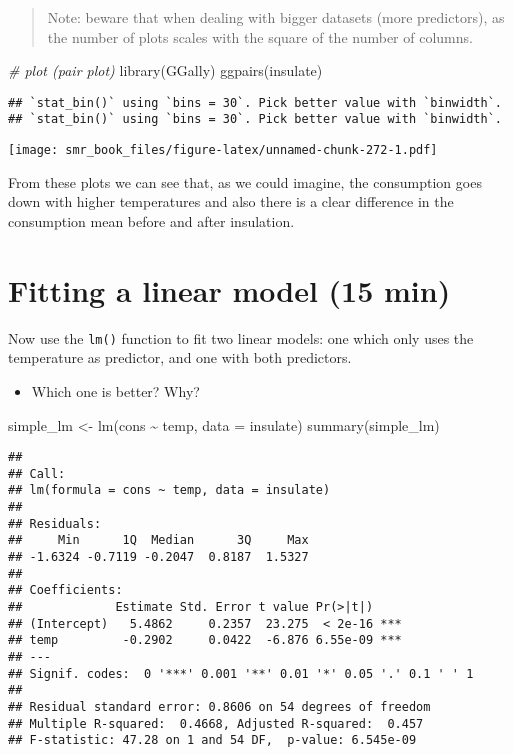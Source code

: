 \documentclass[
  oneside]{book}
\newenvironment{Shaded}{\begin{snugshade}}{\end{snugshade}}
\newcommand{\AttributeTok}[1]{\textcolor[rgb]{0.77,0.63,0.00}{#1}}
\newcommand{\CommentTok}[1]{\textcolor[rgb]{0.56,0.35,0.01}{\textit{#1}}}
\newcommand{\FunctionTok}[1]{\textcolor[rgb]{0.00,0.00,0.00}{#1}}
\newcommand{\NormalTok}[1]{#1}
\newcommand{\OtherTok}[1]{\textcolor[rgb]{0.56,0.35,0.01}{#1}}
\newcommand{\SpecialCharTok}[1]{\textcolor[rgb]{0.00,0.00,0.00}{#1}}
\providecommand{\tightlist}{%
  \setlength{\itemsep}{0pt}\setlength{\parskip}{0pt}}
\begin{document}
\begin{quote}
Note: beware that when dealing with bigger datasets (more
predictors), as the number of plots scales with the square
of the number of columns.
\end{quote}

\begin{Shaded}
\begin{Highlighting}[]
\CommentTok{\# plot (pair plot)}
\FunctionTok{library}\NormalTok{(GGally)}
\FunctionTok{ggpairs}\NormalTok{(insulate)}
\end{Highlighting}
\end{Shaded}

\begin{verbatim}
## `stat_bin()` using `bins = 30`. Pick better value with `binwidth`.
## `stat_bin()` using `bins = 30`. Pick better value with `binwidth`.
\end{verbatim}

\texttt{[image: smr\_book\_files/figure-latex/unnamed-chunk-272-1.pdf]}

From these plots we can see that, as we could imagine,
the consumption goes down with higher temperatures
and also there is a clear difference in the consumption
mean before and after insulation.

\hypertarget{fitting-a-linear-model-15-min}{%
\section{Fitting a linear model (15 min)}\label{fitting-a-linear-model-15-min}}

Now use the \texttt{lm()} function to fit two linear models:
one which only uses the temperature as predictor, and one
with both predictors.

\begin{itemize}
\tightlist
\item
  Which one is better? Why?
\end{itemize}

\begin{Shaded}
\begin{Highlighting}[]
\NormalTok{simple\_lm }\OtherTok{\textless{}{-}} \FunctionTok{lm}\NormalTok{(cons }\SpecialCharTok{\textasciitilde{}}\NormalTok{ temp, }\AttributeTok{data =}\NormalTok{ insulate)}
\FunctionTok{summary}\NormalTok{(simple\_lm)}
\end{Highlighting}
\end{Shaded}

\begin{verbatim}
## 
## Call:
## lm(formula = cons ~ temp, data = insulate)
## 
## Residuals:
##     Min      1Q  Median      3Q     Max 
## -1.6324 -0.7119 -0.2047  0.8187  1.5327 
## 
## Coefficients:
##             Estimate Std. Error t value Pr(>|t|)    
## (Intercept)   5.4862     0.2357  23.275  < 2e-16 ***
## temp         -0.2902     0.0422  -6.876 6.55e-09 ***
## ---
## Signif. codes:  0 '***' 0.001 '**' 0.01 '*' 0.05 '.' 0.1 ' ' 1
## 
## Residual standard error: 0.8606 on 54 degrees of freedom
## Multiple R-squared:  0.4668, Adjusted R-squared:  0.457 
## F-statistic: 47.28 on 1 and 54 DF,  p-value: 6.545e-09
\end{verbatim}
\end{document}
